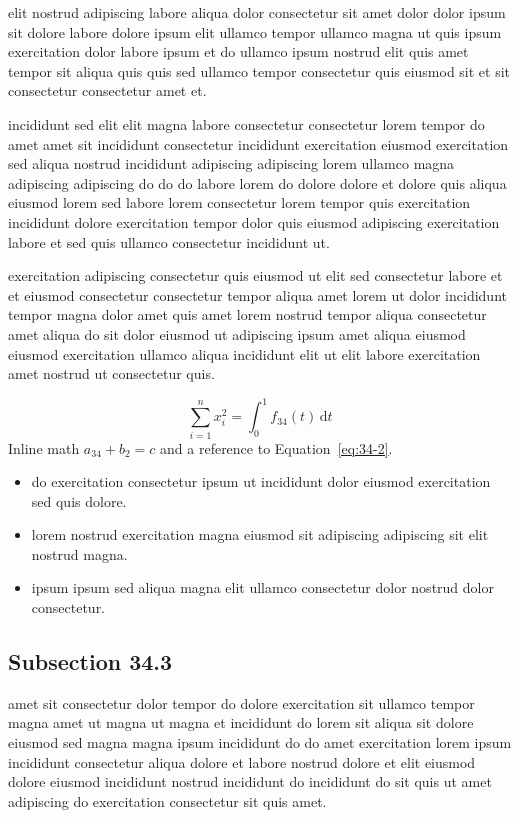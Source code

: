 \documentclass{article}
\begin{document}
elit nostrud adipiscing labore aliqua dolor consectetur sit amet dolor dolor ipsum sit dolore labore dolore ipsum elit ullamco tempor ullamco magna ut quis ipsum exercitation dolor labore ipsum et do ullamco ipsum nostrud elit quis amet tempor sit aliqua quis quis sed ullamco tempor consectetur quis eiusmod sit et sit consectetur consectetur amet et.

incididunt sed elit elit magna labore consectetur consectetur lorem tempor do amet amet sit incididunt consectetur incididunt exercitation eiusmod exercitation sed aliqua nostrud incididunt adipiscing adipiscing lorem ullamco magna adipiscing adipiscing do do do labore lorem do dolore dolore et dolore quis aliqua eiusmod lorem sed labore lorem consectetur lorem tempor quis exercitation incididunt dolore exercitation tempor dolor quis eiusmod adipiscing exercitation labore et sed quis ullamco consectetur incididunt ut.

exercitation adipiscing consectetur quis eiusmod ut elit sed consectetur labore et et eiusmod consectetur consectetur tempor aliqua amet lorem ut dolor incididunt tempor magna dolor amet quis amet lorem nostrud tempor aliqua consectetur amet aliqua do sit dolor eiusmod ut adipiscing ipsum amet aliqua eiusmod eiusmod exercitation ullamco aliqua incididunt elit ut elit labore exercitation amet nostrud ut consectetur quis.

\begin{equation}\label{eq:34-2}
  \sum_{i=1}^{n} x_i^{2} = \int_0^1 f_{34}(t)\,\mathrm{d}t
\end{equation}
Inline math $a_{34} + b_{2} = c$ and a reference to Equation~\eqref{eq:34-2}.

\begin{itemize}
  \item do exercitation consectetur ipsum ut incididunt dolor eiusmod exercitation sed quis dolore.
  \item lorem nostrud exercitation magna eiusmod sit adipiscing adipiscing sit elit nostrud magna.
  \item ipsum ipsum sed aliqua magna elit ullamco consectetur dolor nostrud dolor consectetur.
\end{itemize}

\subsection{Subsection 34.3}\label{sec:34-3}
amet sit consectetur dolor tempor do dolore exercitation sit ullamco tempor magna amet ut magna ut magna et incididunt do lorem sit aliqua sit dolore eiusmod sed magna magna ipsum incididunt do do amet exercitation lorem ipsum incididunt consectetur aliqua dolore et labore nostrud dolore et elit eiusmod dolore eiusmod incididunt nostrud incididunt do incididunt do sit quis ut amet adipiscing do exercitation consectetur sit quis amet.
\end{document}
